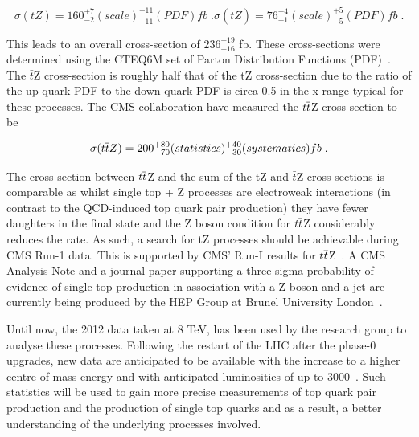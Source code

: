 \begin{equation}
\sigma(tZ)= 160_{-2}^{+7} (scale)_{-11}^{+11} (PDF) fb \;.
\sigma(\bar{t}Z)= 76_{-1}^{+4} (scale)_{-5}^{+5} (PDF) fb \;.
\end{equation}

This leads to an overall cross-section of $236_{-16}^{+19}$ fb. 
These cross-sections were determined using the CTEQ6M set of Parton Distribution Functions (PDF)~\cite{Pumplin:2002vw}. 
The $\bar{t}$Z cross-section is roughly half that of the tZ cross-section due to the ratio of the up quark PDF to the down quark PDF is circa 0.5 in the x range typical for these processes\cite{Campbell:2013yla}. 
The CMS collaboration have measured the $t\overline{t}$Z cross-section to be\cite{Khachatryan:2014ewa}

\begin{equation}
\sigma (t\overline{t} Z)= 200_{-70}^{+80} (statistics)_{-30}^{+40} (systematics) fb \;.
\end{equation}

The cross-section between $t\overline{t}$Z and the sum of the tZ and $\bar{t}$Z cross-sections is comparable as whilst single top + Z processes are electroweak interactions (in contrast to the QCD-induced top quark pair production) they have fewer daughters in the final state and the Z boson condition for $t\overline{t}$Z considerably reduces the rate\cite{Campbell:2013yla}.
As such, a search for tZ processes should be achievable during CMS Run-1 data. This is supported by CMS’ Run-I results for $t\overline{t}$Z~\cite{Khachatryan:2014ewa}. 
A CMS Analysis Note and a journal paper supporting a three sigma probability of evidence of single top production in association with a Z boson and a jet are currently being produced by the HEP Group at Brunel University London~\cite{Sirunyan:2017kkr}.

Until now, the 2012 data taken at 8 TeV, has been used by the research group to analyse these processes.
Following the restart of the LHC after the phase-0 upgrades, new data are anticipated to be available with the increase to a higher centre-of-mass energy and with anticipated luminosities of up to 3000~\fbinv\cite{ECFA}. 
Such statistics will be used to gain more precise measurements of top quark pair production and the production of single top quarks and as a result, a better understanding of the underlying processes involved.
